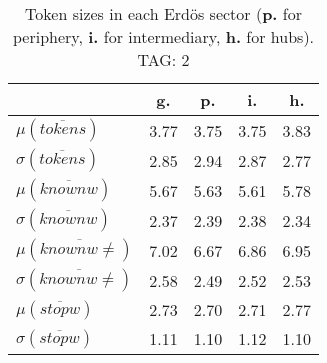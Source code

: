 \begin{table}[h!]
\begin{center}
\begin{tabular}{| l | c | c | c | c |}\hline
 & g. & p. & i. & h. \\\hline
$\mu(\overline{tokens})$ & 3.77  & 3.75  & 3.75  & 3.83 \\\hline
$\sigma(\overline{tokens})$ & 2.85  & 2.94  & 2.87  & 2.77 \\\hline
$\mu(\overline{knownw})$ & 5.67  & 5.63  & 5.61  & 5.78 \\\hline
$\sigma(\overline{knownw})$ & 2.37  & 2.39  & 2.38  & 2.34 \\\hline
$\mu(\overline{knownw \neq})$ & 7.02  & 6.67  & 6.86  & 6.95 \\\hline
$\sigma(\overline{knownw \neq})$ & 2.58  & 2.49  & 2.52  & 2.53 \\\hline
$\mu(\overline{stopw})$ & 2.73  & 2.70  & 2.71  & 2.77 \\\hline
$\sigma(\overline{stopw})$ & 1.11  & 1.10  & 1.12  & 1.10 \\\hline
\end{tabular}
\caption{Token sizes in each Erd\"os sector ({{\bf p.}} for periphery, {{\bf i.}} for intermediary, {{\bf h.}} for hubs). TAG: 2}
\end{center}
\end{table}